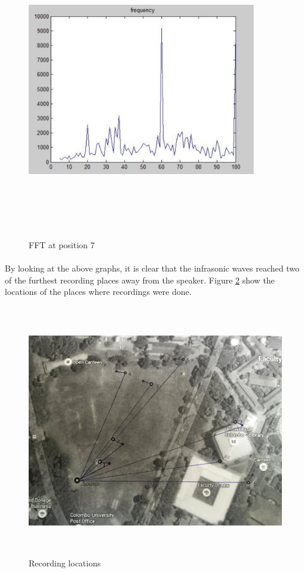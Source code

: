 \documentclass[12pt]{article}
\numberwithin{figure}{section}
\numberwithin{table}{section}
\begin{document}
\begin{figure}[H]
\centering
\includegraphics[width=10cm,height=13cm,keepaspectratio]{position7.png}
\caption{FFT at position 7}
\label{d:p7}
\end{figure}

\paragraph{}
By looking at the above graphs, it is clear that the infrasonic waves reached two of the furthest recording places away from the speaker. Figure \ref{d:map} show the locations of the places where recordings were done.

\begin{figure}[H]
\centering
\includegraphics[width=14cm,height=11cm,keepaspectratio]{map.png}
\caption{Recording locations}
\label{d:map}
\end{figure}
\end{document}
